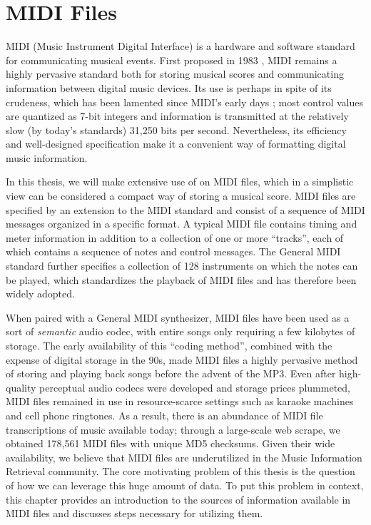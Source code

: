 \chapter{MIDI Files}
\label{ch:midi}

MIDI (Music Instrument Digital Interface) is a hardware and software standard for communicating musical events.
First proposed in 1983 \cite{international1983midi}, MIDI remains a highly pervasive standard both for storing musical scores and communicating information between digital music devices.
Its use is perhaps in spite of its crudeness, which has been lamented since MIDI's early days \cite{moore1988dysfunctions}; most control values are quantized as 7-bit integers and information is transmitted at the relatively slow (by today's standards) 31,250 bits per second.
Nevertheless, its efficiency and well-designed specification make it a convenient way of formatting digital music information.

In this thesis, we will make extensive use of on MIDI files, which in a simplistic view can be considered a compact way of storing a musical score.
MIDI files are specified by an extension to the MIDI standard \cite{international1988standard} and consist of a sequence of MIDI messages organized in a specific format.
A typical MIDI file contains timing and meter information in addition to a collection of one or more ``tracks'', each of which contains a sequence of notes and control messages.
The General MIDI standard \cite{international1991general} further specifies a collection of 128 instruments on which the notes can be played, which standardizes the playback of MIDI files and has therefore been widely adopted.

When paired with a General MIDI synthesizer, MIDI files have been used as a sort of {\em semantic} audio codec, with entire songs only requiring a few kilobytes of storage.
The early availability of this ``coding method'', combined with the expense of digital storage in the 90s, made MIDI files a highly pervasive method of storing and playing back songs before the advent of the MP3.
Even after high-quality perceptual audio codecs were developed and storage prices plummeted, MIDI files remained in use in resource-scarce settings such as karaoke machines and cell phone ringtones.
As a result, there is an abundance of MIDI file transcriptions of music available today; through a large-scale web scrape, we obtained 178,561 MIDI files with unique MD5 checksums.
Given their wide availability, we believe that MIDI files are underutilized in the Music Information Retrieval community.
The core motivating problem of this thesis is the question of how we can leverage this huge amount of data.
To put this problem in context, this chapter provides an introduction to the sources of information available in MIDI files and discusses steps necessary for utilizing them.

